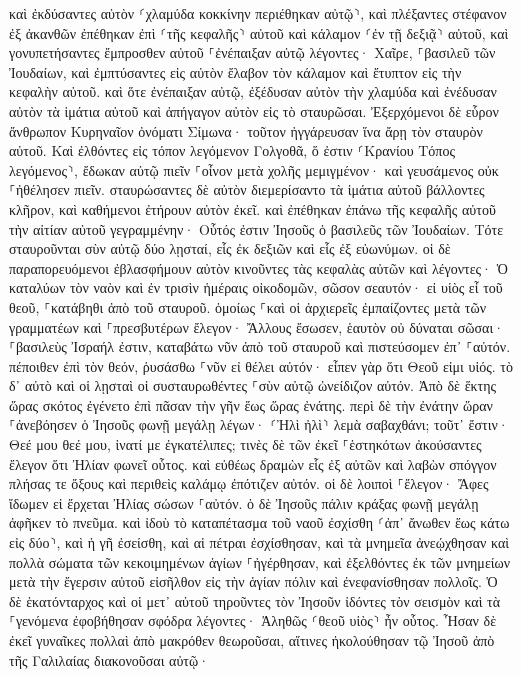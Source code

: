 \documentclass[twoside, 9pt]{extreport}
\begin{document}
καὶ ἐκδύσαντες αὐτὸν ⸂χλαμύδα κοκκίνην περιέθηκαν αὐτῷ⸃, 
καὶ πλέξαντες στέφανον ἐξ ἀκανθῶν ἐπέθηκαν ἐπὶ ⸂τῆς κεφαλῆς⸃ αὐτοῦ καὶ κάλαμον ⸂ἐν τῇ δεξιᾷ⸃ αὐτοῦ, καὶ γονυπετήσαντες ἔμπροσθεν αὐτοῦ ⸀ἐνέπαιξαν αὐτῷ λέγοντες· Χαῖρε, ⸀βασιλεῦ τῶν Ἰουδαίων, 
καὶ ἐμπτύσαντες εἰς αὐτὸν ἔλαβον τὸν κάλαμον καὶ ἔτυπτον εἰς τὴν κεφαλὴν αὐτοῦ. 
καὶ ὅτε ἐνέπαιξαν αὐτῷ, ἐξέδυσαν αὐτὸν τὴν χλαμύδα καὶ ἐνέδυσαν αὐτὸν τὰ ἱμάτια αὐτοῦ καὶ ἀπήγαγον αὐτὸν εἰς τὸ σταυρῶσαι. 
Ἐξερχόμενοι δὲ εὗρον ἄνθρωπον Κυρηναῖον ὀνόματι Σίμωνα· τοῦτον ἠγγάρευσαν ἵνα ἄρῃ τὸν σταυρὸν αὐτοῦ. 
Καὶ ἐλθόντες εἰς τόπον λεγόμενον Γολγοθᾶ, ὅ ἐστιν ⸂Κρανίου Τόπος λεγόμενος⸃, 
ἔδωκαν αὐτῷ πιεῖν ⸀οἶνον μετὰ χολῆς μεμιγμένον· καὶ γευσάμενος οὐκ ⸀ἠθέλησεν πιεῖν. 
σταυρώσαντες δὲ αὐτὸν διεμερίσαντο τὰ ἱμάτια αὐτοῦ βάλλοντες κλῆρον, 
καὶ καθήμενοι ἐτήρουν αὐτὸν ἐκεῖ. 
καὶ ἐπέθηκαν ἐπάνω τῆς κεφαλῆς αὐτοῦ τὴν αἰτίαν αὐτοῦ γεγραμμένην· Οὗτός ἐστιν Ἰησοῦς ὁ βασιλεῦς τῶν Ἰουδαίων. 
Τότε σταυροῦνται σὺν αὐτῷ δύο λῃσταί, εἷς ἐκ δεξιῶν καὶ εἷς ἐξ εὐωνύμων. 
οἱ δὲ παραπορευόμενοι ἐβλασφήμουν αὐτὸν κινοῦντες τὰς κεφαλὰς αὐτῶν 
καὶ λέγοντες· Ὁ καταλύων τὸν ναὸν καὶ ἐν τρισὶν ἡμέραις οἰκοδομῶν, σῶσον σεαυτόν· εἰ υἱὸς εἶ τοῦ θεοῦ, ⸀κατάβηθι ἀπὸ τοῦ σταυροῦ. 
ὁμοίως ⸀καὶ οἱ ἀρχιερεῖς ἐμπαίζοντες μετὰ τῶν γραμματέων καὶ ⸀πρεσβυτέρων ἔλεγον· 
Ἄλλους ἔσωσεν, ἑαυτὸν οὐ δύναται σῶσαι· ⸀βασιλεὺς Ἰσραήλ ἐστιν, καταβάτω νῦν ἀπὸ τοῦ σταυροῦ καὶ πιστεύσομεν ἐπ᾽ ⸀αὐτόν. 
πέποιθεν ἐπὶ τὸν θεόν, ῥυσάσθω ⸀νῦν εἰ θέλει αὐτόν· εἶπεν γὰρ ὅτι Θεοῦ εἰμι υἱός. 
τὸ δ᾽ αὐτὸ καὶ οἱ λῃσταὶ οἱ συσταυρωθέντες ⸀σὺν αὐτῷ ὠνείδιζον αὐτόν. 
Ἀπὸ δὲ ἕκτης ὥρας σκότος ἐγένετο ἐπὶ πᾶσαν τὴν γῆν ἕως ὥρας ἐνάτης. 
περὶ δὲ τὴν ἐνάτην ὥραν ⸀ἀνεβόησεν ὁ Ἰησοῦς φωνῇ μεγάλῃ λέγων· ⸂Ἠλὶ ἠλὶ⸃ λεμὰ σαβαχθάνι; τοῦτ᾽ ἔστιν· Θεέ μου θεέ μου, ἱνατί με ἐγκατέλιπες; 
τινὲς δὲ τῶν ἐκεῖ ⸀ἑστηκότων ἀκούσαντες ἔλεγον ὅτι Ἠλίαν φωνεῖ οὗτος. 
καὶ εὐθέως δραμὼν εἷς ἐξ αὐτῶν καὶ λαβὼν σπόγγον πλήσας τε ὄξους καὶ περιθεὶς καλάμῳ ἐπότιζεν αὐτόν. 
οἱ δὲ λοιποὶ ⸀ἔλεγον· Ἄφες ἴδωμεν εἰ ἔρχεται Ἠλίας σώσων ⸀αὐτόν. 
ὁ δὲ Ἰησοῦς πάλιν κράξας φωνῇ μεγάλῃ ἀφῆκεν τὸ πνεῦμα. 
καὶ ἰδοὺ τὸ καταπέτασμα τοῦ ναοῦ ἐσχίσθη ⸂ἀπ᾽ ἄνωθεν ἕως κάτω εἰς δύο⸃, καὶ ἡ γῆ ἐσείσθη, καὶ αἱ πέτραι ἐσχίσθησαν, 
καὶ τὰ μνημεῖα ἀνεῴχθησαν καὶ πολλὰ σώματα τῶν κεκοιμημένων ἁγίων ⸀ἠγέρθησαν, 
καὶ ἐξελθόντες ἐκ τῶν μνημείων μετὰ τὴν ἔγερσιν αὐτοῦ εἰσῆλθον εἰς τὴν ἁγίαν πόλιν καὶ ἐνεφανίσθησαν πολλοῖς. 
Ὁ δὲ ἑκατόνταρχος καὶ οἱ μετ᾽ αὐτοῦ τηροῦντες τὸν Ἰησοῦν ἰδόντες τὸν σεισμὸν καὶ τὰ ⸀γενόμενα ἐφοβήθησαν σφόδρα λέγοντες· Ἀληθῶς ⸂θεοῦ υἱὸς⸃ ἦν οὗτος. 
Ἦσαν δὲ ἐκεῖ γυναῖκες πολλαὶ ἀπὸ μακρόθεν θεωροῦσαι, αἵτινες ἠκολούθησαν τῷ Ἰησοῦ ἀπὸ τῆς Γαλιλαίας διακονοῦσαι αὐτῷ· 
\end{document}

